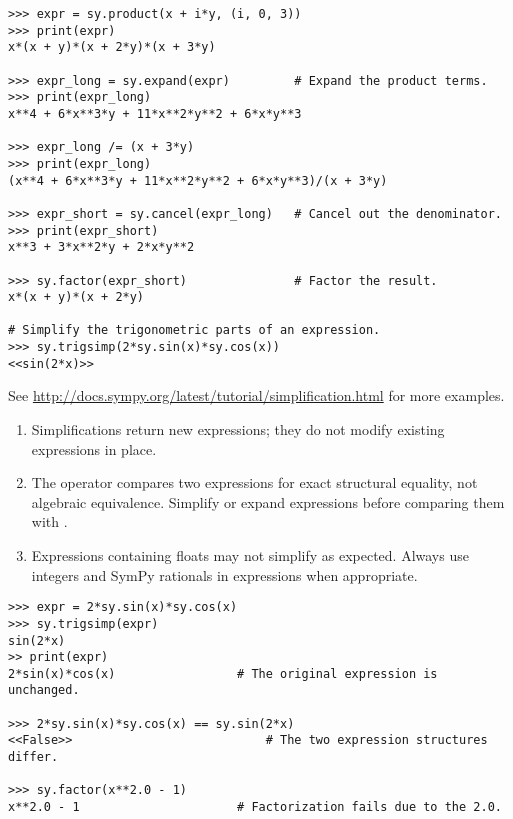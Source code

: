 \begin{lstlisting}
>>> expr = sy.product(x + i*y, (i, 0, 3))
>>> print(expr)
x*(x + y)*(x + 2*y)*(x + 3*y)

>>> expr_long = sy.expand(expr)         # Expand the product terms.
>>> print(expr_long)
x**4 + 6*x**3*y + 11*x**2*y**2 + 6*x*y**3

>>> expr_long /= (x + 3*y)
>>> print(expr_long)
(x**4 + 6*x**3*y + 11*x**2*y**2 + 6*x*y**3)/(x + 3*y)

>>> expr_short = sy.cancel(expr_long)   # Cancel out the denominator.
>>> print(expr_short)
x**3 + 3*x**2*y + 2*x*y**2

>>> sy.factor(expr_short)               # Factor the result.
x*(x + y)*(x + 2*y)

# Simplify the trigonometric parts of an expression.
>>> sy.trigsimp(2*sy.sin(x)*sy.cos(x))
<<sin(2*x)>>
\end{lstlisting}

See \url{http://docs.sympy.org/latest/tutorial/simplification.html} for more examples.

\begin{warn}
\begin{enumerate}
\item Simplifications return new expressions; they do not modify existing expressions in place.

\item The \li{==} operator compares two expressions for exact structural equality, not algebraic equivalence.
Simplify or expand expressions before comparing them with \li{==}.

\item Expressions containing floats may not simplify as expected.
Always use integers and SymPy rationals in expressions when appropriate.
\end{enumerate}

\begin{lstlisting}
>>> expr = 2*sy.sin(x)*sy.cos(x)
>>> sy.trigsimp(expr)
sin(2*x)
>> print(expr)
2*sin(x)*cos(x)                 # The original expression is unchanged.

>>> 2*sy.sin(x)*sy.cos(x) == sy.sin(2*x)
<<False>>                           # The two expression structures differ.

>>> sy.factor(x**2.0 - 1)
x**2.0 - 1                      # Factorization fails due to the 2.0.
\end{lstlisting}
\end{warn}

